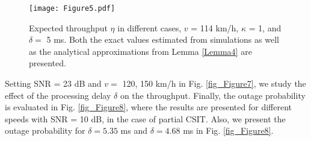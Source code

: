 \begin{figure}
\centering
  \texttt{[image: Figure5.pdf]}\\
\caption{Expected throughput $\eta$ in different cases, $v$ = 114 km/h, $\kappa$ = 1, and $\delta = $ 5 ms. Both the exact values estimated from  simulations as well as the analytical approximations from Lemma \ref{Lemma4} are presented.}\label{fig_Figure5}
\end{figure}



Setting SNR = 23 dB and $v = $ 120, 150 km/h in Fig. \ref{fig_Figure7},  we study the effect of the processing delay $\delta$ on the throughput. Finally, the outage probability is evaluated in Fig. \ref{fig_Figure8}, where the results are presented for different speeds with SNR = 10 dB, in the case of partial CSIT. Also, we present  the outage probability for $\delta = 5.35$ ms and $\delta = 4.68$ ms in Fig.  \ref{fig_Figure8}. 









